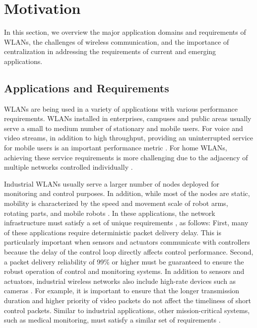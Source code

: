


\section{Motivation}
\label{motivation}
In this section, we overview the major application domains and requirements of WLANs, the challenges of wireless communication, and the importance of centralization in addressing the requirements of current and emerging applications.





\subsection{Applications and Requirements}
\label{app_req}
WLANs are being used in a variety of applications with various performance requirements.
WLANs installed in enterprises, campuses and public areas usually serve a small to medium number of stationary and mobile users.
For voice and video streams, in addition to high throughput, providing an uninterrupted service for mobile users is an important performance metric \cite{oliveira_characterizing_2016}.
For home WLANs, achieving these service requirements is more challenging due to the adjacency of multiple networks controlled individually \cite{COAP,ResFi}.


Industrial WLANs usually serve a larger number of nodes deployed for monitoring and control purposes.
In addition, while most of the nodes are static, mobility is characterized by the speed and movement scale of robot arms, rotating parts, and mobile robots \cite{li2017industrial}.
In these applications, the network infrastructure must satisfy a set of unique requirements \cite{luvisotto2017ultra,tramarin2016use,RTwifi}, as follows:
First, many of these applications require deterministic packet delivery delay.
This is particularly important when sensors and actuators communicate with controllers because the delay of the control loop directly affects control performance.
Second, a packet delivery reliability of 99\% or higher must be guaranteed to ensure the robust operation of control and monitoring systems.
In addition to sensors and actuators, industrial wireless networks also include high-rate devices such as cameras \cite{silvestre2011online}.
For example, it is important to ensure that the longer transmission duration and higher priority of video packets do not affect the timeliness of short control packets.
Similar to industrial applications, other mission-critical systems, such as medical monitoring, must satisfy a similar set of requirements \cite{REWIMO}.


